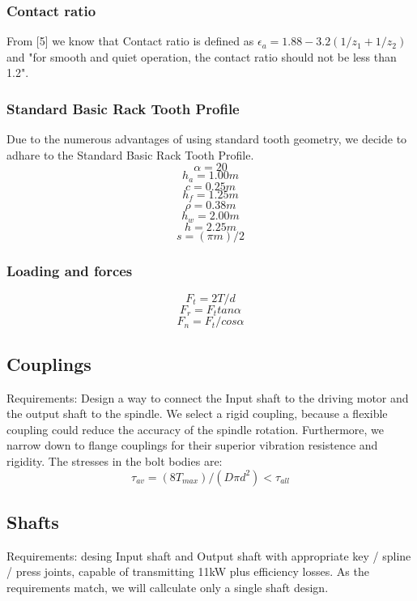 \documentclass{article}
\begin{document}
\subsubsection{Contact ratio}
From [5] we know that Contact ratio is defined as
$\epsilon_a = 1.88 - 3.2 (1/z_1 + 1/z_2)$ %
and "for smooth and quiet operation, the contact ratio should not be less than 1.2".
\subsubsection{Standard Basic Rack Tooth Profile}
Due to the numerous advantages of using standard tooth geometry, we decide to adhare to the Standard Basic Rack Tooth Profile.
$$\alpha = 20$$  %
$$h_a = 1.00m$$ %
$$c = 0.25m$$ %
$$h_f = 1.25m$$ %
$$\rho = 0.38m$$ %
$$h_w = 2.00m$$ %
$$h = 2.25m$$ %
$$s = (\pi m)/ 2$$ %
\subsubsection{Loading and forces}
$$F_t = 2T / d$$ %
$$F_r = F_t tan\alpha$$
$$F_n = F_t / cos \alpha $$ %

\subsection{Couplings}
Requirements: Design a way to connect the Input shaft to the driving motor and the output shaft to the spindle.
We select a rigid coupling, because a flexible coupling could reduce the accuracy of the spindle rotation.
Furthermore, we narrow down to flange couplings for their superior vibration resistence and rigidity.
The stresses in the bolt bodies are:
$$\tau_{av} = (8 T_{max}) / (D \pi d^2) < \tau_{all}$$  %

\subsection{Shafts}
Requirements: desing Input shaft and Output shaft with appropriate key / spline / press  joints, capable of transmitting 11kW plus efficiency losses.
As the requirements match, we will callculate only a single shaft design.
\FPeval{}
\vExample
\end{document}
